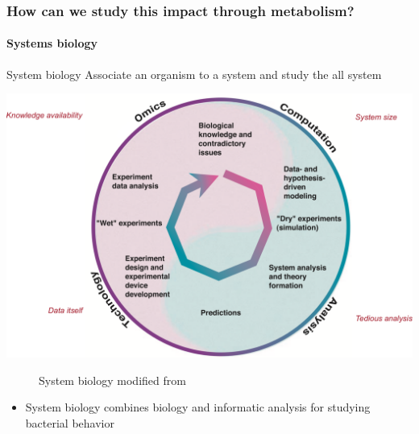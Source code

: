 \documentclass[8pt]{beamer}
\begin{document}
\begin{frame}
\frametitle{How can we study this impact through metabolism? }
\framesubtitle{Systems biology}
\begin{exampleblock}{System biology}
Associate an organism to a system and study the all system \tiny \citep{Kitano2002}
\end{exampleblock}
\begin{minipage}{0.8\textwidth}
\includegraphics[width=\textwidth]{figures/systeme-biology.pdf}
\end{minipage}%
\begin{minipage}{0.2\textwidth}
\begin{figure}
\caption{System biology modified from \cite{Kitano2002}}
\end{figure}
\end{minipage}
\vspace{-0.2cm}
\begin{block}{}
\begin{itemize}
\item System biology combines biology and informatic analysis for studying bacterial behavior
\end{itemize}
\end{block}
\end{frame}
\end{document}
